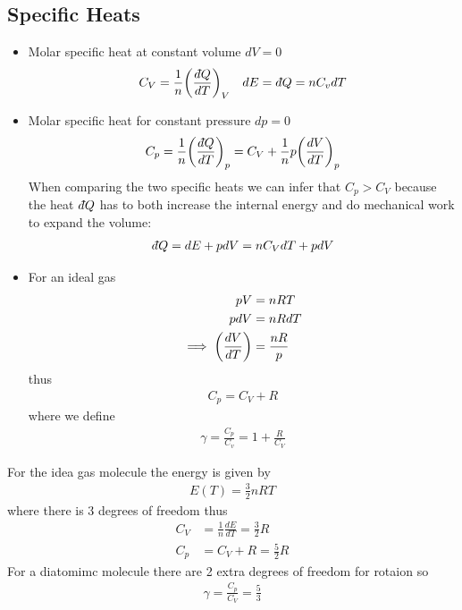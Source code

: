 \documentclass[../main.tex]{subfiles}
\begin{document}
\subsection{Specific Heats}
\begin{itemize}
    \item Molar specific heat at constant volume $dV = 0$
    \begin{align*}
        C_V = \frac{1}{n} \qt(\frac{\dbar Q}{dT})_V \quad dE = \dbar Q = n C_v dT
    \end{align*}
    \item Molar specific heat for constant pressure $dp = 0$
    \begin{align*}
        C_p = \frac{1}{n} \qt(\frac{\dbar Q}{dT})_p = C_V + \frac{1}{n} p \qt(\frac{dV}{dT})_p
    \end{align*}
    When comparing the two specific heats we can infer that $C_p > C_V$ because the heat $d\hspace*{-0.08em}\bar{}\hspace*{0.1em} Q$ has to both increase the internal energy and do mechanical work to expand the volume:
    \begin{align*}
        d\hspace*{-0.08em}\bar{}\hspace*{0.1em} Q = dE + pdV = n C_V dT + pdV
    \end{align*}
    \item For an ideal gas
    \begin{align*}
        pV &= nRT \\
        p dV &= nR dT \\
        \implies \qt(\frac{dV}{dT}) &= \frac{nR}{p}
    \end{align*}
    thus
    \begin{align*}
        C_p = C_V + R
    \end{align*}
    where we define
    \begin{align*}
        \gamma = \frac{C_p}{C_v} = 1 + \frac{R}{C_V}
    \end{align*}
\end{itemize}
For the idea gas molecule the energy is given by
\begin{align*}
    E(T) = \frac{3}{2} nRT 
\end{align*}
where there is $3$ degrees of freedom thus
\begin{align*}
    C_V &=  \frac{1}{n} \frac{dE}{dT} = \frac{3}{2} R \\
    C_p &= C_V + R = \frac{5}{2} R
\end{align*}
For a diatomimc molecule there are 2 extra degrees of freedom for rotaion so
\begin{align*}
    \gamma = \frac{C_p}{C_V} = \frac{5}{3}
\end{align*}
\end{document}
